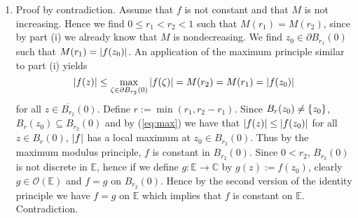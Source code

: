 \begin{enumerate}[label = \textbf{Exercise \arabic*.},wide = 0pt, itemsep=1.5ex]
\begin{enumerate}[label = (\roman*),wide = 0pt, itemsep=1.5ex]
				\begin{lemma}
					$M$ is nondecreasing.
				\end{lemma}
				\begin{proof}
					Let $0 \leq r_1 < r_2 < 1$. We have $\overline{B_{r_2}}(0) \subseteq \mathbb{E}$. Thus $f$ is holomorphic in the bounded domain $B_{r_2}(0)$ and continuous on $\overline{B_{r_2}}(0)$. The maximum modulus principle \cite[91]{fischer2003funktionentheorie} implies 
				\begin{equation}
					\abs[0]{f(z)} \leq \max_{\zeta \in \partial B_{r_2}(0)}\abs[0]{f(\zeta)} = M(r_2)
				\end{equation}
				\noindent for all $z \in \overline{B_{r_2}}(0)$. In particular 
				\begin{equation}
					M(r_1) = \max_{\zeta \in \partial B_{r_1}(0)}\abs[0]{f(\zeta)} \leq \max_{\zeta \in \partial B_{r_2}(0)}\abs[0]{f(\zeta)} = M(r_2).
				\end{equation}
				Thus $M$ is nondecreasing.
				\end{proof}

			\item Proof by contradiction. Assume that $f$ is not constant and that $M$ is not increasing. Hence we find $0 \leq r_1 < r_2 < 1$ such that $M(r_1) = M(r_2)$, since by part (i) we already know that $M$ is nondecreasing. We find $z_0 \in \partial B_{r_1}(0)$ such that $M(r_1) = \abs[0]{f(z_0)}$. An application of the maximum principle similar to part (i) yields
				\begin{equation}
					\abs[0]{f(z)} \leq \max_{\zeta \in \partial B_{r_2}(0)}	\abs[0]{f(\zeta)} = M(r_2) = M(r_1) = \abs[0]{f(z_0)}
					\label{eq:max}
				\end{equation}
				\noindent for all $z \in \overline{B_{r_2}}(0)$. Define $r := \min(r_1,r_2 - r_1)$. Since $B_r(z_0) \neq \cbr[0]{z_0}$, $B_r(z_0) \subseteq B_{r_2}(0)$ and by (\ref{eq:max}) we have that $\abs[0]{f(z)} \leq \abs[0]{f(z_0)}$ for all $z \in B_r(0)$, $\abs[0]{f}$ has a local maximum at $z_0 \in B_{r_2}(0)$. Thus by the maximum modulus principle, $f$ is constant in $B_{r_2}(0)$. Since $0 < r_2$, $B_{r_2}(0)$ is not discrete in $\mathbb{E}$, hence if we define $g: \mathbb{E} \to \mathbb{C}$ by $g(z) := f(z_0)$, clearly $g \in \mathcal{O}(\mathbb{E})$ and $f = g$ on $B_{r_2}(0)$. Hence by the second version of the identity principle \cite[85]{fischer2003funktionentheorie} we have $f = g$ on $\mathbb{E}$ which implies that $f$ is constant on $\mathbb{E}$. Contradiction. 
		\end{enumerate}


\end{enumerate}
